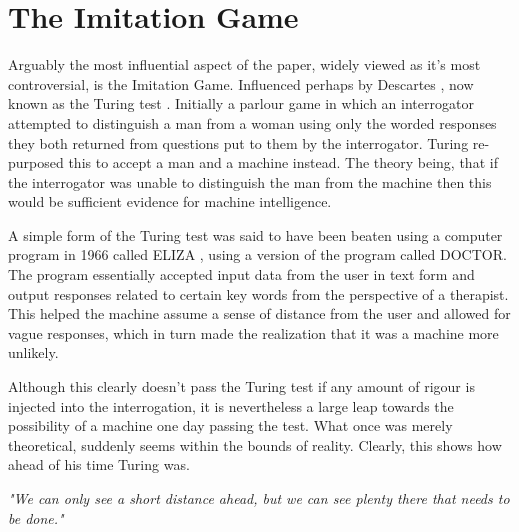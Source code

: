 \documentclass{scrartcl}
\begin{document}
\section{The Imitation Game}

Arguably the most influential aspect of the paper, widely viewed as it's most controversial, is the Imitation Game. Influenced perhaps by Descartes \cite{descartes1996discourse:6}, now known as the Turing test \cite{suchman1987plans:7}. Initially a parlour game in which an interrogator attempted to distinguish a man from a woman using only the worded responses they both returned from questions put to them by the interrogator. Turing re-purposed this to accept a man and a machine instead. The theory being, that if the interrogator was unable to distinguish the man from the machine then this would be sufficient evidence for machine intelligence. \par
A simple form of the Turing test was said to have been beaten using a computer program in 1966 called ELIZA \cite{weizenbaum1966eliza:8}, using a version of the program called DOCTOR. The program essentially accepted input data from the user in text form and output responses related to certain key words from the perspective of a therapist. This helped the machine assume a sense of distance from the user and allowed for vague responses, which in turn made the realization that it was a machine more unlikely. \par
Although this clearly doesn't pass the Turing test if any amount of rigour is injected into the interrogation, it is nevertheless a large leap towards the possibility of a machine one day passing the test. What once was merely theoretical, suddenly seems within the bounds of reality. Clearly, this shows how ahead of his time Turing was.\par 
\textit{"We can only see a short distance ahead, but we can see plenty there that needs to be done."}












\end{document}
